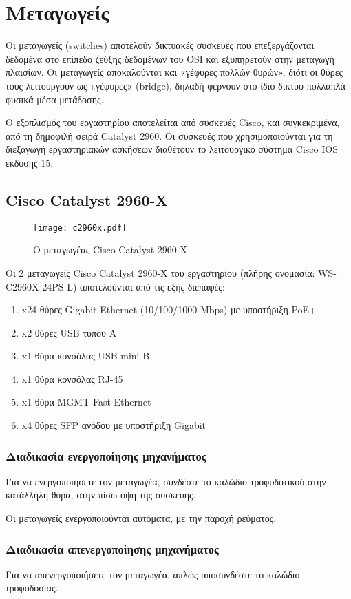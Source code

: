 \documentclass{EdipyLabs} %
\begin{document}
\section{Μεταγωγείς}
Οι μεταγωγείς (switches) αποτελούν δικτυακές συσκευές που επεξεργάζονται δεδομένα στο επίπεδο ζεύξης δεδομένων του OSI και εξυπηρετούν στην μεταγωγή πλαισίων. Οι μεταγωγείς αποκαλούνται και «γέφυρες πολλών θυρών», διότι οι θύρες τους λειτουργούν ως «γέφυρες» (bridge), δηλαδή φέρνουν στο ίδιο δίκτυο πολλαπλά φυσικά μέσα μετάδοσης.

Ο εξοπλισμός του εργαστηρίου αποτελείται από συσκευές Cisco, και συγκεκριμένα, από τη δημοφιλή σειρά Catalyst 2960. Οι συσκευές που χρησιμοποιούνται για τη διεξαγωγή εργαστηριακών ασκήσεων διαθέτουν το λειτουργικό σύστημα Cisco IOS έκδοσης 15.
\subsection{Cisco Catalyst 2960-X}
\begin{figure}[H]
	\centering
	\texttt{[image: c2960x.pdf]}
	\caption{Ο μεταγωγέας Cisco Catalyst 2960-X}\label{fig:c2960x}
\end{figure}

Οι 2 μεταγωγείς Cisco Catalyst 2960-X του εργαστηρίου (πλήρης ονομασία: WS-C2960X-24PS-L) αποτελούνται από τις εξής διεπαφές:
\begin{enumerate}
	\item x24 θύρες Gigabit Ethernet (10/100/1000 Mbps) με υποστήριξη PoE+
	\item x2 θύρες USB τύπου A
	\item x1 θύρα κονσόλας USB mini-B
	\item x1 θύρα κονσόλας RJ-45
	\item x1 θύρα MGMT Fast Ethernet
	\item x4 θύρες SFP ανόδου με υποστήριξη Gigabit
\end{enumerate}

\subsubsection*{Διαδικασία ενεργοποίησης μηχανήματος}
Για να ενεργοποιήσετε τον μεταγωγέα, συνδέστε το καλώδιο τροφοδοτικού στην κατάλληλη θύρα, στην πίσω όψη της συσκευής. 

Οι μεταγωγείς ενεργοποιούνται αυτόματα, με την παροχή ρεύματος. 

\subsubsection*{Διαδικασία απενεργοποίησης μηχανήματος}
Για να απενεργοποιήσετε τον μεταγωγέα, απλώς αποσυνδέστε το καλώδιο τροφοδοσίας. 
\end{document}
